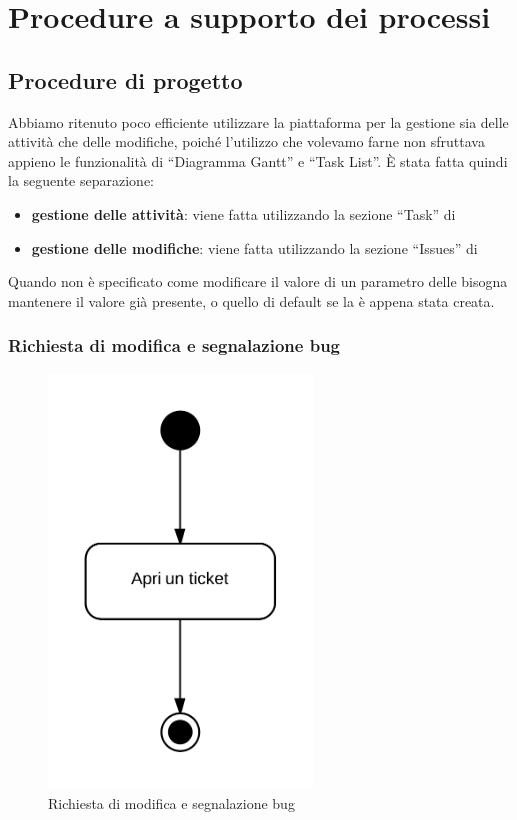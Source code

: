 \section{Procedure a supporto dei processi}


\subsection{Procedure di progetto}
\label{procedurediprogetto}

Abbiamo ritenuto poco efficiente utilizzare la piattaforma  per la gestione sia delle attività che delle modifiche, poiché l'utilizzo che volevamo farne non sfruttava appieno le funzionalità di ``Diagramma Gantt'' e ``Task List''. È stata fatta quindi la seguente separazione:
\begin{itemize}
 \item \textbf{gestione delle attività}: viene fatta utilizzando la sezione ``Task'' di 
 \item \textbf{gestione delle modifiche}: viene fatta utilizzando la sezione ``Issues'' di 
\end{itemize}

Quando non è specificato come modificare il valore di un parametro delle  bisogna mantenere il valore già presente, o quello di default se la  è appena stata creata.

\subsubsection{Richiesta di modifica e segnalazione bug}
\label{aperturaissue}

\begin{figure}[H]
    \centering
    \includegraphics[width=7cm]{uml-processi/richiesta_di_modifica_e_segnalazione_bug.png}
    \caption{Richiesta di modifica e segnalazione bug}
\end{figure}

